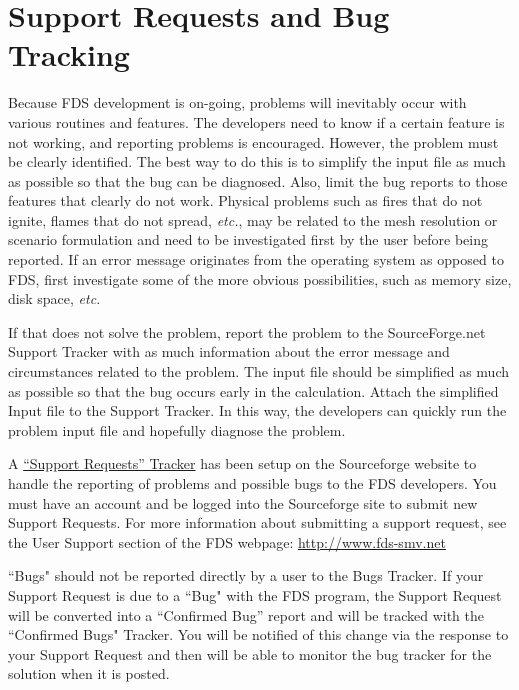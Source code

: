 \documentclass[11pt]{book}
\begin{document}
\section{Support Requests and Bug Tracking}%
Because FDS development is on-going, problems will inevitably occur
with various routines and features. The developers need to know if a certain
feature is not working, and reporting problems is encouraged. However, the
problem must be clearly identified. The best way to do this is to simplify
the input file as much as possible so that the bug can be diagnosed.
Also, limit the bug reports to those features that clearly do not work.
Physical problems such as fires that do not ignite, flames that do not
spread, {\em etc.}, may be related to the mesh resolution or scenario
formulation and need to be investigated first by the user before being
reported. If an error message originates from the operating system as
opposed to FDS, first investigate some of the more obvious possibilities,
such as memory size, disk space, {\em etc.}

If that does not solve the problem, report the problem to the SourceForge.net
Support Tracker with as much information about the error message and
circumstances related to the problem. The input file should be simplified
as much as possible so that the bug occurs early in the calculation.
Attach the simplified Input file to the Support Tracker.  In this way, the developers can
quickly run the problem input file and hopefully diagnose the problem.

A \href{https://sourceforge.net/tracker/?group_id=183854&atid=906915}{``Support Requests'' Tracker}
has been setup on the Sourceforge website to handle the reporting of
problems and possible bugs to the FDS developers.  You must have an account
and be logged into the Sourceforge site to submit new Support Requests.
For more information about submitting a support request, see the User Support section of the FDS webpage:
\href{http://www.fds-smv.net}{{\ct http://www.fds-smv.net}}

\begin{warning}
\noindent
``Bugs" should not be reported directly by a user to the Bugs Tracker.
If your Support Request is due to a ``Bug" with the FDS program,
the Support Request will be converted into a ``Confirmed Bug'' report and will be tracked
with the ``Confirmed Bugs" Tracker.  You will be notified of this change via the
response to your Support Request and then will be able to monitor the bug tracker
for the solution when it is posted.
\end{warning}
\end{document}
